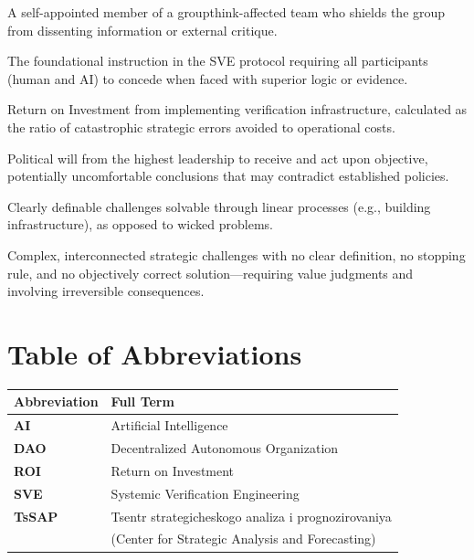 \documentclass[11pt,a4paper]{article}
\begin{document}
\begin{description}[style=nextline, leftmargin=0pt, labelindent=0pt, font=\normalfont\bfseries]
    \item[Mindguard] A self-appointed member of a groupthink-affected team who shields the group from dissenting information or external critique.
    
    \item[Prime Directive] The foundational instruction in the SVE protocol requiring all participants (human and AI) to concede when faced with superior logic or evidence.
    
    \item[ROI of Truth] Return on Investment from implementing verification infrastructure, calculated as the ratio of catastrophic strategic errors avoided to operational costs.
    
    \item[Sanction for Truth] Political will from the highest leadership to receive and act upon objective, potentially uncomfortable conclusions that may contradict established policies.
    
    \item[Tame Problems] Clearly definable challenges solvable through linear processes (e.g., building infrastructure), as opposed to wicked problems.
    
    \item[Wicked Problems] Complex, interconnected strategic challenges with no clear definition, no stopping rule, and no objectively correct solution—requiring value judgments and involving irreversible consequences.
\end{description}

\section*{Table of Abbreviations}

\begin{tabular}{@{}>{\bfseries}ll@{}}
\toprule
\normalfont\textbf{Abbreviation} & \textbf{Full Term} \\
\midrule
AI & Artificial Intelligence \\
DAO & Decentralized Autonomous Organization \\
ROI & Return on Investment \\
SVE & Systemic Verification Engineering \\
TsSAP & Tsentr strategicheskogo analiza i prognozirovaniya \\
& (Center for Strategic Analysis and Forecasting) \\
\bottomrule
\end{tabular}
\end{document}
